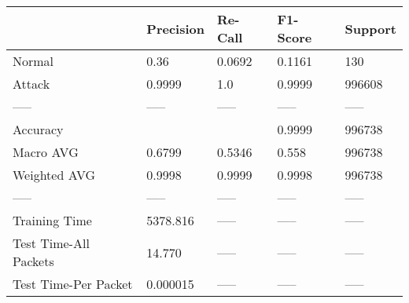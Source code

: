 \begin{tabular}{lllll}
\toprule
{} & Precision & Re-Call & F1-Score & Support \\
\midrule
Normal                &      0.36 &  0.0692 &   0.1161 &     130 \\
Attack                &    0.9999 &     1.0 &   0.9999 &  996608 \\
-----                 &     ----- &   ----- &    ----- &   ----- \\
Accuracy              &           &         &   0.9999 &  996738 \\
Macro AVG             &    0.6799 &  0.5346 &    0.558 &  996738 \\
Weighted AVG          &    0.9998 &  0.9999 &   0.9998 &  996738 \\
-----                 &     ----- &   ----- &    ----- &   ----- \\
Training Time         &  5378.816 &   ----- &    ----- &   ----- \\
Test Time-All Packets &    14.770 &   ----- &    ----- &   ----- \\
Test Time-Per Packet  &  0.000015 &   ----- &    ----- &   ----- \\
\bottomrule
\end{tabular}
